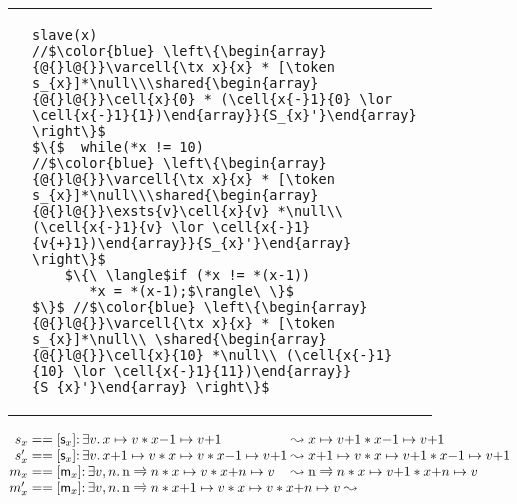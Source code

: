 \begin{figure}
\begin{tabular}{@{} l @{\hspace{8ex}} l@{}}
{\begin{lstlisting}
\end{lstlisting}}
&
\begin{lstlisting}
slave(x)
//$\color{blue} \left\{\begin{array}{@{}l@{}}\varcell{\tx x}{x} * [\token s_{x}]*\null\\\shared{\begin{array}{@{}l@{}}\cell{x}{0} * (\cell{x{-}1}{0} \lor \cell{x{-}1}{1})\end{array}}{S_{x}'}\end{array} \right\}$
$\{$  while(*x != 10)
//$\color{blue} \left\{\begin{array}{@{}l@{}}\varcell{\tx x}{x} * [\token s_{x}]*\null\\\shared{\begin{array}{@{}l@{}}\exsts{v}\cell{x}{v} *\null\\ (\cell{x{-}1}{v} \lor \cell{x{-}1}{v{+}1})\end{array}}{S_{x}'}\end{array} \right\}$
    $\{\ \langle$if (*x != *(x-1))
       *x = *(x-1);$\rangle\ \}$
$\}$ //$\color{blue} \left\{\begin{array}{@{}l@{}}\varcell{\tx x}{x} * [\token s_{x}]*\null\\ \shared{\begin{array}{@{}l@{}}\cell{x}{10} *\null\\ (\cell{x{-}1}{10} \lor \cell{x{-}1}{11})\end{array}}{S_{x}'}\end{array} \right\}$
\end{lstlisting}
\end{tabular}
\[
\begin{array}{@{}r@{}l@{}l@{}}
  s_x &\null ==
  [\token s_x]{:}\, \exsts{v} \cell{x}{v} * \cell{x{-}1}{v{+}1} &\null\swap
  \cell{x}{v{+}1} * \cell{x{-}1}{v{+}1}
  \\
  s'_x &\null ==
  [\token s_x]{:}\, \exsts{v} \cell{x{+}1}{v} * \cell{x}{v} * \cell{x{-}1}{v{{+}}1} &\null\swap
  \cell{x{+}1}{v} * \cell{x}{v{+}1} * \cell{x{-}1}{v{+}1}\\
  m_{x} &\null ==
  [\token m_{x}]{:}\, \exsts{v,n}\varcell{\tx n}{n} * \cell{x}{v} * \cell{x{+}n}{v} &\null\swap
  \varcell{\tx n}{n} * \cell{x}{v{+}1} * \cell{x{+}n}{v}
  \\
  m'_{x} &
  \multicolumn{2}{@{}l@{}}{%
    \null ==  [\token m_{x}]{:}\, \exsts{v,n}
  \begin{array}[t]{@{}l@{}}
    \varcell{\tx n}{n} * \cell{x{+}1}{v} * \cell{x}{v} * \cell{x{+}n}{v} \swap\null\\

\end{array}}
\end{array}\]
\end{figure}
